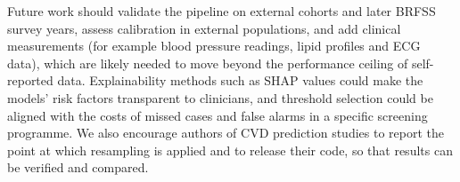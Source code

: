 Future work should validate the pipeline on external cohorts and later
BRFSS survey years, assess calibration in external populations, and add clinical measurements (for example blood pressure readings, lipid
profiles and ECG data), which are likely needed to move beyond the
performance ceiling of self-reported data. Explainability methods such as
SHAP values could make the models' risk factors transparent to clinicians,
and threshold selection could be aligned with the costs of missed cases
and false alarms in a specific screening programme. We also encourage
authors of CVD prediction studies to report the point at which resampling
is applied and to release their code, so that results can be verified and
compared.

